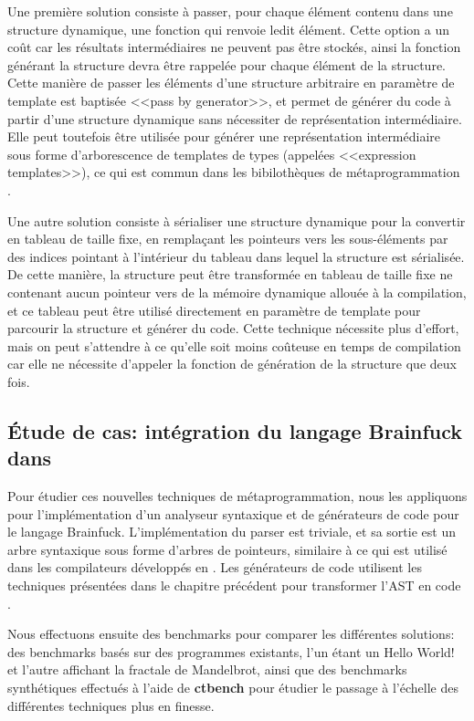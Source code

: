 \documentclass[main]{subfiles}
\begin{document}
Une premi\`ere solution consiste \`a passer, pour chaque \'el\'ement contenu
dans une structure dynamique, une fonction qui renvoie ledit \'el\'ement.
Cette option a un co\^ut car les r\'esultats interm\'ediaires ne peuvent pas
\^etre stock\'es, ainsi la fonction g\'en\'erant la structure devra \^etre
rappel\'ee pour chaque \'el\'ement de la structure. Cette mani\`ere de passer
les \'el\'ements d'une structure arbitraire en param\`etre de template est
baptis\'ee <<pass by generator>>, et permet de g\'en\'erer du code \`a partir
d'une structure dynamique sans n\'ecessiter de repr\'esentation interm\'ediaire.
Elle peut toutefois \^etre utilis\'ee pour g\'en\'erer une repr\'esentation
interm\'ediaire sous forme d'arborescence de templates de types (appel\'ees
<<expression templates>>), ce qui est commun dans les bibiloth\`eques de
m\'etaprogrammation \cpp.

Une autre solution consiste \`a s\'erialiser une structure dynamique pour
la convertir en tableau de taille fixe, en rempla\c{c}ant les pointeurs vers
les sous-\'el\'ements par des indices pointant \`a l'int\'erieur du tableau
dans lequel la structure est s\'erialis\'ee. De cette mani\`ere, la structure
peut \^etre transform\'ee en tableau de taille fixe ne contenant aucun pointeur
vers de la m\'emoire dynamique allou\'ee \`a la compilation, et ce tableau
peut \^etre utilis\'e directement en param\`etre de template pour parcourir
la structure et g\'en\'erer du code.
Cette technique n\'ecessite plus d'effort, mais on peut s'attendre \`a
ce qu'elle soit moins co\^uteuse en temps de compilation car elle ne n\'ecessite
d'appeler la fonction de g\'en\'eration de la structure que deux fois.

\subsection*{
  \'Etude de cas: int\'egration du langage Brainfuck dans \cpp
}

Pour \'etudier ces nouvelles techniques de m\'etaprogrammation,
nous les appliquons pour l'impl\'ementation d'un analyseur syntaxique et
de g\'en\'erateurs de code pour le langage Brainfuck.
L'impl\'ementation du parser est triviale, et sa sortie est un arbre syntaxique
sous forme d'arbres de pointeurs, similaire \`a ce qui est utilis\'e dans les
compilateurs d\'evelopp\'es en \cpp.
Les g\'en\'erateurs de code utilisent les techniques pr\'esent\'ees
dans le chapitre pr\'ec\'edent pour transformer l'AST en code \cpp.

Nous effectuons ensuite des benchmarks pour comparer
les diff\'erentes solutions: des benchmarks bas\'es sur
des programmes existants, l'un \'etant un Hello World! et l'autre affichant
la fractale de Mandelbrot, ainsi que des benchmarks synth\'etiques effectu\'es
\`a l'aide de \textbf{ctbench} pour \'etudier le passage \`a l'\'echelle
des diff\'erentes techniques plus en finesse.
\end{document}
